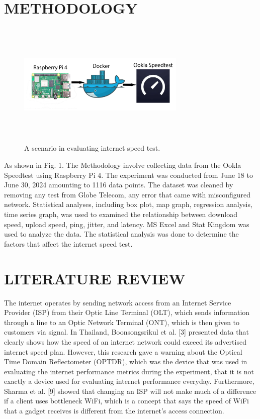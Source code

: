 \documentclass[conference]{IEEEtran}
\begin{document}
\section{METHODOLOGY}
\begin{figure}[!htbp]
\centerline{\includegraphics[width=8cm,height=6cm,keepaspectratio]{Figures/Picture0.png}}
\caption{A scenario in evaluating internet speed test.}
\label{fig1}
\end{figure}
As shown in Fig. 1. The Methodology involve collecting data from the Ookla Speedtest using Raspberry Pi 4.
The experiment was conducted from June 18 to June 30, 2024 amounting to 1116 data points. The dataset was cleaned by removing any test from Globe Telecom, any error that came with misconfigured network.
Statistical analyses, including box plot, map graph, regression analysis, time series graph, was used to examined the relationship between download speed, upload speed, ping, jitter, and latency.
MS Excel and Stat Kingdom was used to analyze the data. The statistical analysis was done to determine the factors that affect the internet speed test.

\section{LITERATURE REVIEW}

The internet operates by sending network access from an Internet Service Provider (ISP) from their Optic Line Terminal (OLT), which sends information through a line to an Optic Network Terminal (ONT), which is then given to customers via signal. In Thailand, Boonsongsrikul et al. [3] presented data that clearly shows how the speed of an internet network could exceed its advertised internet speed plan. However, this research gave a warning about the Optical Time Domain Reflectometer (OPTDR), which was the device that was used in evaluating the internet performance metrics during the experiment, that it is not exactly a device used for evaluating internet performance everyday. Furthermore, Sharma et al. [9] showed that changing an ISP will not make much of a difference if a client uses bottleneck WiFi, which is a concept that says the speed of WiFi that a gadget receives is different from the internet's access connection.
\end{document}
